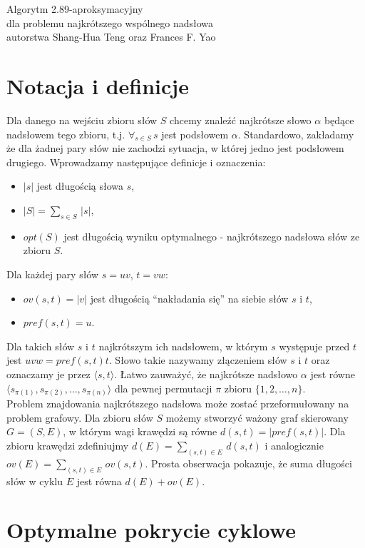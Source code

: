 \documentclass[12pt]{article}
\begin{document}
\begin{center}
    \Large{Algorytm 2.89-aproksymacyjny \\ dla problemu najkrótszego wspólnego nadsłowa} \\
    \large{autorstwa Shang-Hua Teng oraz Frances F. Yao \cite{Teng-Yao}}
\end{center}

\section{Notacja i definicje}

Dla danego na wejściu zbioru słów $S$ chcemy znaleźć najkrótsze słowo $\alpha$ będące nadsłowem tego zbioru, t.j. $\forall_{s \in S} \, s$ jest podsłowem $\alpha$.
Standardowo, zakładamy że dla żadnej pary słów nie zachodzi sytuacja, w której jedno jest podsłowem drugiego.
Wprowadzamy następujące definicje i oznaczenia:
\begin{itemize}
\item $|s|$ jest długością słowa $s$,
\item $|S|=\sum_{s \in S}\,|s|$,
\item $opt(S)$ jest długością wyniku optymalnego - najkrótszego nadsłowa słów ze zbioru $S$.
\end{itemize}
Dla każdej pary słów $s=uv$, $t=vw$:
\begin{itemize}
\item $ov(s,t)=|v|$ jest długością ``nakładania się'' na siebie słów $s$ i $t$,
\item $pref(s,t)=u$.
\end{itemize}
Dla takich słów $s$ i $t$ najkrótszym ich nadsłowem, w którym $s$ występuje przed $t$ jest $uvw=pref(s,t)t$.
Słowo takie nazywamy złączeniem słów $s$ i $t$ oraz oznaczamy je przez $\langle s,t \rangle$.
Łatwo zauważyć, że najkrótsze nadsłowo $\alpha$ jest równe $\langle s_{\pi(1)},s_{\pi(2)},\dots,s_{\pi(n)} \rangle$ dla pewnej permutacji $\pi$ zbioru $\{1,2,\dots,n\}$. \\

Problem znajdowania najkrótszego nadsłowa może zostać przeformułowany na problem grafowy.
Dla zbioru słów $S$ możemy stworzyć ważony graf skierowany $G=(S,E)$, w którym wagi krawędzi są równe $d(s,t)=|pref(s,t)|$.
Dla zbioru krawędzi zdefiniujmy $d(E)=\sum_{(s,t) \in E}\,d(s,t)$ i analogicznie $ov(E)=\sum_{(s,t) \in E}\,ov(s,t)$.
Prosta obserwacja pokazuje, że suma długości słów w cyklu $E$ jest równa $d(E)+ov(E)$. 

\section{Optymalne pokrycie cyklowe}
\end{document}
